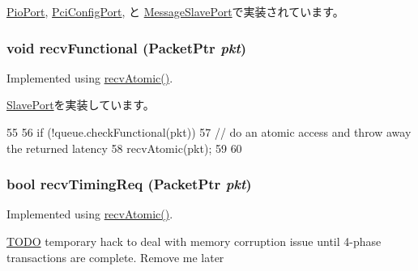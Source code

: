 \hyperlink{classPioPort_a5f0b4c4a94f6b0053f9d7a4eb9c2518a}{PioPort}, \hyperlink{classPciDevice_1_1PciConfigPort_a5f0b4c4a94f6b0053f9d7a4eb9c2518a}{PciConfigPort}, と \hyperlink{classMessageSlavePort_a5f0b4c4a94f6b0053f9d7a4eb9c2518a}{MessageSlavePort}で実装されています。\hypertarget{classSimpleTimingPort_aeefa907fb6d6a787e6dab90e8138ea90}{
\subsubsection[{recvFunctional}]{\setlength{\rightskip}{0pt plus 5cm}void recvFunctional ({\bf PacketPtr} {\em pkt})}}
\label{classSimpleTimingPort_aeefa907fb6d6a787e6dab90e8138ea90}
Implemented using \hyperlink{classSimpleTimingPort_a428ab07671bc9372dc44a2487b12a726}{recvAtomic()}. 

\hyperlink{classSlavePort_a6a3d6f2e5dab6bed16d53d9e7c17378d}{SlavePort}を実装しています。


\begin{DoxyCode}
55 {
56     if (!queue.checkFunctional(pkt)) {
57         // do an atomic access and throw away the returned latency
58         recvAtomic(pkt);
59     }
60 }
\end{DoxyCode}
\hypertarget{classSimpleTimingPort_a3344d9dd0f83257feab5424e761f31c6}{
\subsubsection[{recvTimingReq}]{\setlength{\rightskip}{0pt plus 5cm}bool recvTimingReq ({\bf PacketPtr} {\em pkt})}}
\label{classSimpleTimingPort_a3344d9dd0f83257feab5424e761f31c6}
Implemented using \hyperlink{classSimpleTimingPort_a428ab07671bc9372dc44a2487b12a726}{recvAtomic()}. 

\begin{Desc}
\item[\hyperlink{todo__todo000088}{TODO}]temporary hack to deal with memory corruption issue until 4-\/phase transactions are complete. Remove me later \end{Desc}


